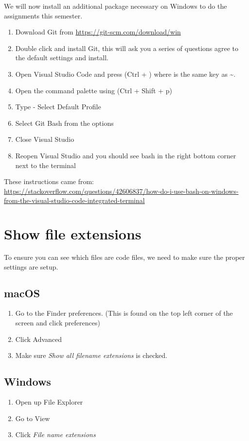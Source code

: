 \documentclass[12pt]{article}
\begin{document}
We will now install an additional package necessary on Windows to do the assignments this semester.
\begin{enumerate}
\item Download Git from \url{https://git-scm.com/download/win}
\item Double click and install Git, this will ask you a series of questions agree to the default settings and install.
\item Open Visual Studio Code and press (Ctrl + \textasciigrave) where  \textasciigrave is the same key as \textasciitilde{}.
\item Open the command palette using (Ctrl + Shift + p)
\item Type - Select Default Profile
\item Select Git Bash from the options
\item Close Visual Studio
\item Reopen Visual Studio and you should see bash in the right bottom corner next to the terminal
\end{enumerate}
These instructions came from:
\url{https://stackoverflow.com/questions/42606837/how-do-i-use-bash-on-windows-from-the-visual-studio-code-integrated-terminal}

\section{Show file extensions}
To ensure you can see which files are code files, we need to make sure the proper settings are setup.

\subsection{macOS}
\begin{enumerate}
\item Go to the Finder preferences. (This is found on the top left corner of the screen and click preferences)
\item Click Advanced
\item Make sure \textit{Show all filename extensions} is checked.
\end{enumerate}


\subsection{Windows}
\begin{enumerate}
\item Open up File Explorer 
\item Go to View
 \item Click \textit{File name extensions} 
\end{enumerate}
\end{document}

